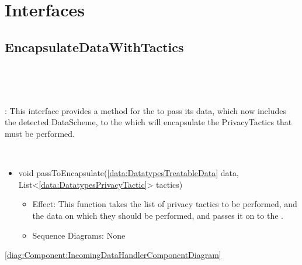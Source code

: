 

\section{Interfaces} \label{sec:interfaces}
  \subsection{EncapsulateDataWithTactics}\label{int:InterfacesEncapsulateDataWithTactics}
    \begin{description}
      \item[Provided by:] \iconcomponent{}~
      \item[Required by:] \iconcomponent{}~ 
           \item[Description]: This interface provides a method for the  to pass its data, which now includes the detected DataScheme, to the  which will encapsulate the PrivacyTactics that must be performed.
      \item[Operations:] ~
    \begin{itemize}[noitemsep,nolistsep,leftmargin=-.25cm]
      \item \textsf{void passToEncapsulate(\ref{data:DatatypesTreatableData} data, List\textless{}\ref{data:DatatypesPrivacyTactic}\textgreater{} tactics)}
        \begin{itemize}[noitemsep,nolistsep]
           \item Effect: This function takes the list of privacy tactics to be performed, and the data on which they should be performed, and passes it on to the . 
           \item Sequence Diagrams: None
        \end{itemize}
    \end{itemize}
      \item[Diagrams:] \cref{diag:Component:IncomingDataHandlerComponentDiagram}
    \end{description}


